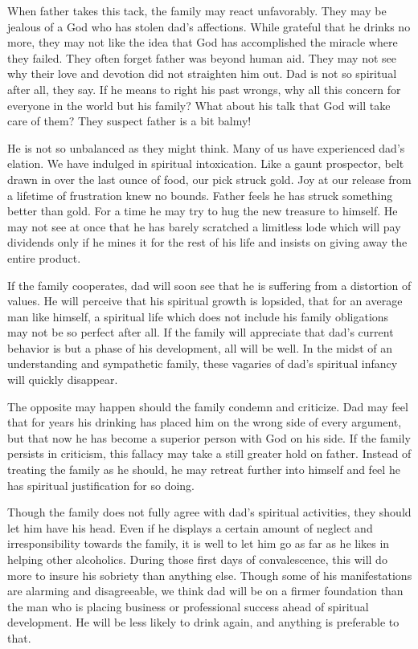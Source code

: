\begin{biblechapter}
When father takes this tack, the family may react unfavorably.  They may be jealous of a God who has stolen dad's affections.  While grateful that he drinks no more, they may not like the idea that God has accomplished the miracle where they failed.  They often forget father was beyond human aid.  They may not see why their love and devotion did not straighten him out.  Dad is not so spiritual after all, they say.  If he means to right his past wrongs, why all this concern for everyone in the world but his family?  What about his talk that God will take care of them?  They suspect father is a bit balmy!

He is not so unbalanced as they might think.  Many of us have experienced dad's elation.  We have indulged in spiritual intoxication.  Like a gaunt prospector, belt drawn in over the last ounce of food, our pick struck gold.  Joy at our release from a lifetime of frustration knew no bounds.  Father feels he has struck something better than gold.  For a time he may try to hug the new treasure to himself.  He may not see at once that he has barely scratched a limitless lode which will pay dividends only if he mines it for the rest of his life and insists on giving away the entire product. 

If the family cooperates, dad will soon see that he is suffering from a distortion of values.  He will perceive that his spiritual growth is lopsided, that for an average man like himself, a spiritual life which does not include his family obligations may not be so perfect after all.  If the family will appreciate that dad's current behavior is but a phase of his development, all will be well.  In the midst of an understanding and sympathetic family, these vagaries of dad's spiritual infancy will quickly disappear.

The opposite may happen should the family condemn and criticize.  Dad may feel that for years his drinking has placed him on the wrong side of every argument, but that now he has become a superior person with God on his side.  If the family persists in criticism, this fallacy may take a still greater hold on father.  Instead of treating the family as he should, he may retreat further into himself and feel he has spiritual justification for so doing.

Though the family does not fully agree with dad's spiritual activities, they should let him have his head.  Even if he displays a certain amount of neglect and irresponsibility towards the family, it is well to let him go as far as he likes in helping other alcoholics.  During those first days of convalescence, this will do more to insure his sobriety than anything else.  Though some of his manifestations are alarming and disagreeable, we think dad will be on a firmer foundation than the man who is placing business or professional success ahead of spiritual development.  He will be less likely to drink again, and anything is preferable to that.


\end{biblechapter}
